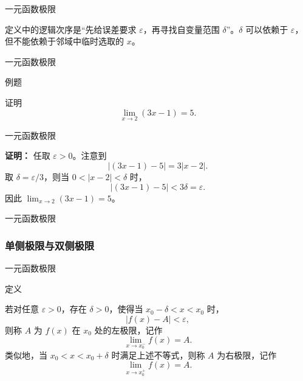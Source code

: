 \documentclass[aspectratio=169,10pt,fontset=fandol]{ctexbeamer}
\newenvironment{custom}[1]{\par\noindent\textbf{#1}\quad}{\par\vspace{0.8em}}
\begin{document}
\begin{frame}[t,fragile]{一元函数极限}
\normalsize
{\normalsize
定义中的逻辑次序是“先给误差要求 \(\varepsilon\)，再寻找自变量范围 \(\delta\)”。\(\delta\) 可以依赖于 \(\varepsilon\)，但不能依赖于邻域中临时选取的 \(x\)。


}
\end{frame}
\begin{frame}[t,fragile]{一元函数极限}
\normalsize
\begin{block}{例题}
{\normalsize

证明
\[
\lim_{x\to2}(3x-1)=5.
\]

}
\end{block}
\end{frame}
\begin{frame}[t,fragile]{一元函数极限}
\normalsize
{\normalsize
\textbf{证明：}
任取 \(\varepsilon>0\)。注意到
\[
|(3x-1)-5|=3|x-2|.
\]
取 \(\delta=\varepsilon/3\)，则当 \(0<|x-2|<\delta\) 时，
\[
|(3x-1)-5|<3\delta=\varepsilon.
\]
因此 \(\lim_{x\to2}(3x-1)=5\)。

}
\end{frame}
\begin{frame}[t,fragile]{一元函数极限}
\normalsize
{\normalsize
\subsubsection*{单侧极限与双侧极限}


}
\end{frame}
\begin{frame}[t,fragile]{一元函数极限}
\normalsize
\begin{block}{定义}
{\normalsize

若对任意 \(\varepsilon>0\)，存在 \(\delta>0\)，使得当 \(x_0-\delta<x<x_0\) 时，
\[
|f(x)-A|<\varepsilon,
\]
则称 \(A\) 为 \(f(x)\) 在 \(x_0\) 处的左极限，记作
\[
\lim_{x\to x_0^-}f(x)=A.
\]
类似地，当 \(x_0<x<x_0+\delta\) 时满足上述不等式，则称 \(A\) 为右极限，记作
\[
\lim_{x\to x_0^+}f(x)=A.
\]

}
\end{block}
\end{frame}
\end{document}
